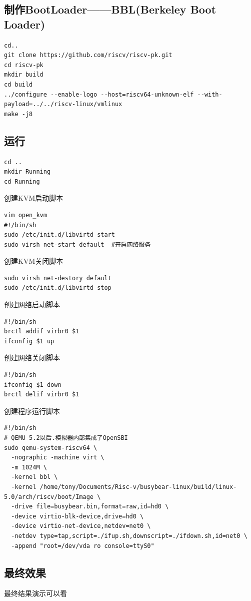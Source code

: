 \subsection{制作BootLoader——BBL(Berkeley Boot Loader)}
\begin{lstlisting}
cd..
git clone https://github.com/riscv/riscv-pk.git
cd riscv-pk
mkdir build
cd build
../configure --enable-logo --host=riscv64-unknown-elf --with-payload=../../riscv-linux/vmlinux
make -j8
\end{lstlisting}

\subsection{运行}
\begin{lstlisting}
cd ..
mkdir Running
cd Running
\end{lstlisting}
创建KVM启动脚本
\begin{lstlisting}
vim open_kvm
#!/bin/sh
sudo /etc/init.d/libvirtd start
sudo virsh net-start default  #开启网络服务
\end{lstlisting}

创建KVM关闭脚本
\begin{lstlisting}
sudo virsh net-destory default
sudo /etc/init.d/libvirtd stop
\end{lstlisting}


创建网络启动脚本
\begin{lstlisting}
#!/bin/sh
brctl addif virbr0 $1
ifconfig $1 up
\end{lstlisting}

创建网络关闭脚本
\begin{lstlisting}
#!/bin/sh
ifconfig $1 down
brctl delif virbr0 $1
\end{lstlisting}

创建程序运行脚本
\begin{lstlisting}
#!/bin/sh
# QEMU 5.2以后.模拟器内部集成了OpenSBI
sudo qemu-system-riscv64 \
  -nographic -machine virt \
  -m 1024M \
  -kernel bbl \
  -kernel /home/tony/Documents/Risc-v/busybear-linux/build/linux-5.0/arch/riscv/boot/Image \
  -drive file=busybear.bin,format=raw,id=hd0 \
  -device virtio-blk-device,drive=hd0 \
  -device virtio-net-device,netdev=net0 \
  -netdev type=tap,script=./ifup.sh,downscript=./ifdown.sh,id=net0 \
  -append "root=/dev/vda ro console=ttyS0" 
\end{lstlisting}






\subsection{最终效果}
最终结果演示可以看 \cite{结果演示} 



